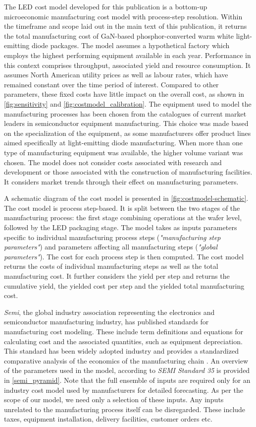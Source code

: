 \documentclass[parskip=full]{article}
\begin{document}
The LED cost model developed for this publication is a bottom-up microeconomic manufacturing cost model with process-step resolution. Within the timeframe and scope laid out in the main text of this publication, it returns the total manufacturing cost of GaN-based phosphor-converted warm white light-emitting diode packages. The model assumes a hypothetical factory which employs the highest performing equipment available in each year. Performance in this context comprises throughput, associated yield and resource consumption. It assumes North American utility prices as well as labour rates, which have remained constant over the time period of interest. Compared to other parameters, these fixed costs have little impact on the overall cost, as shown in \cref{fig:sensitivity} and \cref{fig:costmodel_calibration}. The equipment used to model the manufacturing processes has been chosen from the catalogues of current market leaders in semiconductor equipment manufacturing. This choice was made based on the specialization of the equipment, as some manufacturers offer product lines aimed specifically at light-emitting diode manufacturing. When more than one type of manufacturing equipment was available, the higher volume variant was chosen. The model does not consider costs associated with research and development or those associated with the construction of manufacturing facilities. It considers market trends through their effect on manufacturing parameters. 

A schematic diagram of the cost model is presented in \cref{fig:costmodel-schematic}. The cost model is process step-based. It is split between the two stages of the manufacturing process: the first stage combining operations at the wafer level, followed by the LED packaging stage. The model takes as inputs parameters specific to individual manufacturing process steps (\textit{"manufacturing step parameters"}) and parameters affecting all manufacturing steps (\textit{"global parameters"}). The cost for each process step is then computed. The cost model returns the costs of individual manufacturing steps as well as the total manufacturing cost. It further considers the yield per step and returns the cumulative yield, the yielded cost per step and the yielded total manufacturing cost.

\textit{Semi}, the global industry association representing the electronics and semiconductor manufacturing industry, has published standards for manufacturing cost modeling. These include term definitions and equations for calculating cost and the associated quantities, such as equipment depreciation. This standard has been widely adopted industry and provides a standardized comparative analysis of the economics of the manufacturing chain \cite{ragona2002cost}\cite{wouters2018industry}. An overview of the parameters used in the model, according to \textit{SEMI Standard 35} is provided in \cref{semi_pyramid}. Note that the full ensemble of inputs are required only for an industry cost model used by manufacturers for detailed forecasting. As per the scope of our model, we need only a selection of these inputs. Any inputs unrelated to the manufacturing process itself can be disregarded. These include taxes, equipment installation, delivery facilities, customer orders etc.
\end{document}
